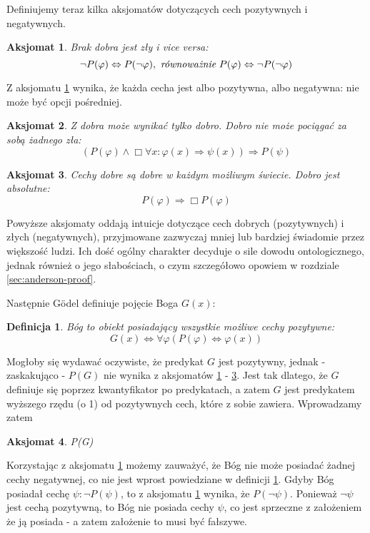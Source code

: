 \documentclass{article}
\newtheorem{axiom-g}{Aksjomat}
\newtheorem{definition-g}{Definicja}
\begin{document}
Definiujemy teraz kilka aksjomatów dotyczących cech pozytywnych i negatywnych. 
\begin{axiom-g} \label{axiom:godel1}
	Brak dobra jest zły i vice versa: 
	\begin{equation*}
	\neg P(\varphi) \Leftrightarrow P(\neg \varphi),\ \emph{równoważnie}\ P(\varphi) \Leftrightarrow \neg P(\neg \varphi)
	\end{equation*}
\end{axiom-g}
Z aksjomatu \ref{axiom:godel1} wynika, że każda cecha jest albo pozytywna, albo negatywna: nie może być opcji pośredniej. 
\begin{axiom-g} \label{axiom:godel2}
	Z dobra może wynikać tylko dobro. Dobro nie może pociągać za sobą żadnego zła: 
	\begin{equation*}
	\left( P(\varphi) \wedge \Box \forall x: \varphi(x) \Rightarrow \psi(x) \right) \Rightarrow P(\psi)
	\end{equation*}
\end{axiom-g}
\begin{axiom-g} \label{axiom:godel3}
	Cechy dobre są dobre w każdym możliwym świecie. Dobro jest absolutne:
	\begin{equation*}
	P(\varphi) \Rightarrow \Box P(\varphi)
	\end{equation*}
\end{axiom-g}
Powyższe aksjomaty oddają intuicje dotyczące cech dobrych (pozytywnych) i złych (negatywnych), przyjmowane zazwyczaj mniej lub bardziej świadomie przez większość ludzi. Ich dość ogólny charakter decyduje o sile dowodu ontologicznego, jednak również o jego słabościach, o czym szczegółowo opowiem w rozdziale \ref{sec:anderson-proof}. 

Następnie Gödel definiuje pojęcie Boga $G(x)$:
\begin{definition-g} \label{def:godel1}
	Bóg to obiekt posiadający wszystkie możliwe cechy pozytywne: 
	\begin{equation*}
	G(x) \Leftrightarrow \forall \varphi \left( P(\varphi) \Leftrightarrow \varphi(x) \right)
	\end{equation*}
\end{definition-g}
Mogłoby się wydawać oczywiste, że predykat $G$ jest pozytywny, jednak - zaskakująco - $P(G)$ nie wynika z aksjomatów \ref{axiom:godel1} - \ref{axiom:godel3}. Jest tak dlatego, że $G$ definiuje się poprzez kwantyfikator po predykatach, a zatem $G$ jest predykatem wyższego rzędu (o 1) od pozytywnych cech, które z sobie zawiera. Wprowadzamy zatem
\begin{axiom-g} \label{axiom:godel4}
	P(G)
\end{axiom-g}
Korzystając z aksjomatu \ref{axiom:godel1} możemy zauważyć, że Bóg nie może posiadać żadnej cechy negatywnej, co nie jest wprost powiedziane w definicji \ref{def:godel1}. Gdyby Bóg posiadał cechę $\psi: \neg P(\psi)$, to z aksjomatu \ref{axiom:godel1} wynika, że $P(\neg \psi)$. Ponieważ $\neg \psi$ jest cechą pozytywną, to Bóg nie posiada cechy $\psi$, co jest sprzeczne z założeniem że ją posiada - a zatem założenie to musi być fałszywe. 
\end{document}
